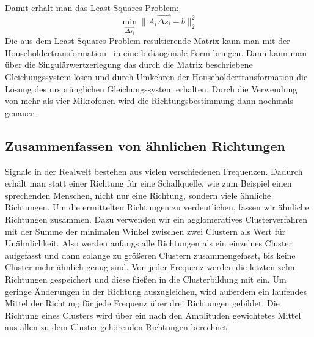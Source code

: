 Damit erhält man das Least Squares Problem:
\begin{equation}
    \min_{\vec{\Delta{s}_i}}{\|A_i\vec{\Delta{s}_i} - b\|_2^2}
\end{equation}
Die aus dem Least Squares Problem resultierende Matrix kann man mit der Householdertransformation~\cite{householder2006principles} in eine bidiaogonale Form bringen. Dann kann man über die Singulärwertzerlegung das durch die Matrix beschriebene Gleichungssystem lösen und durch Umkehren der Householdertransformation die Lösung des ursprünglichen Gleichungssystem erhalten. Durch die Verwendung von mehr als vier Mikrofonen wird die Richtungsbestimmung dann nochmals genauer.
\subsection{Zusammenfassen von ähnlichen Richtungen}
Signale in der Realwelt bestehen aus vielen verschiedenen Frequenzen. Dadurch erhält man statt einer Richtung für eine Schallquelle, wie zum Beispiel einen sprechenden Menschen, nicht nur eine Richtung, sondern viele ähnliche Richtungen. Um die ermittelten Richtungen zu verdeutlichen, fassen wir ähnliche Richtungen zusammen. Dazu verwenden wir ein agglomeratives Clusterverfahren mit der Summe der minimalen Winkel zwischen zwei Clustern als Wert für Unähnlichkeit. Also werden anfangs alle Richtungen als ein einzelnes Cluster aufgefasst und dann solange zu größeren Clustern zusammengefasst, bis keine Cluster mehr ähnlich genug sind. Von jeder Frequenz werden die letzten zehn Richtungen gespeichert und diese fließen in die Clusterbildung mit ein. Um geringe Änderungen in der Richtung auszugleichen, wird außerdem ein laufendes Mittel der Richtung für jede Frequenz über drei Richtungen gebildet. Die Richtung eines Clusters wird über ein nach den Amplituden gewichtetes Mittel aus allen zu dem Cluster gehörenden Richtungen berechnet.

